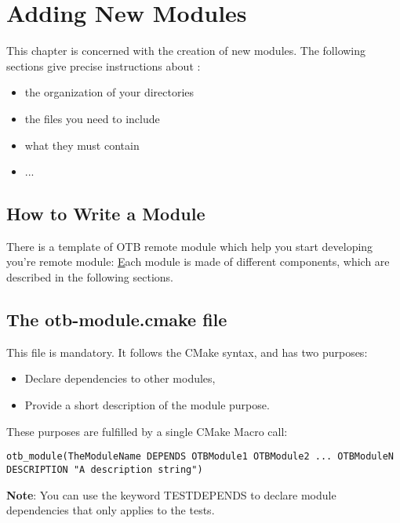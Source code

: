 \chapter{Adding New Modules}
\label{chapter:newModules}

This chapter is concerned with the creation of new modules. 
The following sections give precise instructions about :
\begin{itemize}
	\item the organization of your directories
	\item the files you need to include
	\item what they must contain
	\item ...
\end{itemize}

\section{How to Write a Module}
\label{sec:writemodule}

There is a template of OTB remote module which help you  start developing you're
remote module: \href{https://github.com/orfeotoolbox/otbExternalModuleTemplate}

Each module is made of different components, which are described in the following sections.

\section{The otb-module.cmake file}

This file is mandatory. It follows the CMake syntax, and has two purposes: 

\begin{itemize}
       \item Declare dependencies to other modules, 
       \item Provide a short description of the module purpose. 
\end{itemize}

These purposes are fulfilled by a single CMake Macro call: 

\begin{verbatim}
otb_module(TheModuleName DEPENDS OTBModule1 OTBModule2 ... OTBModuleN DESCRIPTION "A description string")
\end{verbatim}

\textbf{Note}: You can use the keyword TEST\textunderscore DEPENDS to declare module dependencies that only applies to the tests.


